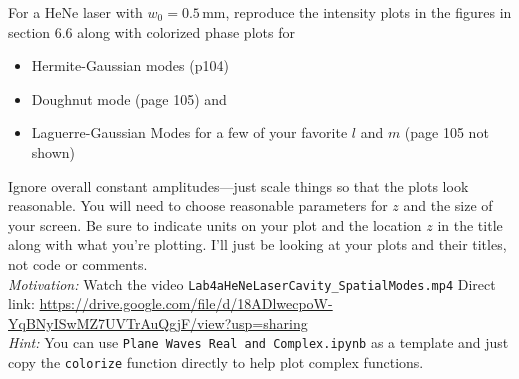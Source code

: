 \documentclass[11pt]{hmcpset}
\begin{document}
%



\begin{problem}
	For a HeNe laser with $w_0=0.5$\,mm, reproduce the intensity plots in the figures in section 6.6 along with colorized phase plots for
	\begin{itemize}
		\item Hermite-Gaussian modes (p104)
		\item Doughnut mode (page 105) and 
		\item Laguerre-Gaussian Modes for a few of your favorite $l$ and $m$ (page 105 not shown)
	\end{itemize}
	Ignore overall constant amplitudes---just scale things so that the plots look reasonable. You will need to choose reasonable parameters for $z$ and the size of your screen. Be sure to indicate units on your plot and the location $z$ in the title along with what you're plotting. I'll just be looking at your plots and their titles, not code or comments. \\
	
	\textit{Motivation:} Watch the video \texttt{Lab4aHeNeLaserCavity\_SpatialModes.mp4} Direct link: \url{https://drive.google.com/file/d/18ADlwecpoW-YqBNyISwMZ7UVTrAuQgjF/view?usp=sharing} \\
	
	\textit{Hint:} You can use \texttt{Plane Waves Real and Complex.ipynb} as a template and just copy the \texttt{colorize} function directly to help plot complex functions.
\end{problem}

\begin{solution}
	\vfill
\end{solution}
\pagebreak
\end{document}
